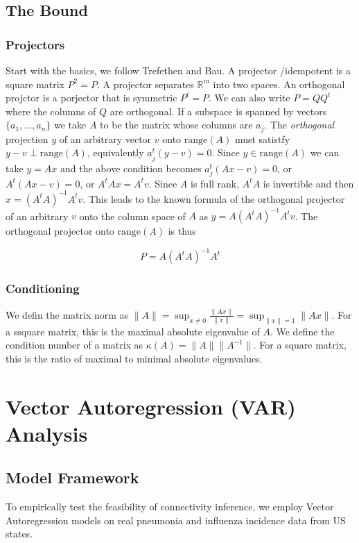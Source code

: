 
\subsection{The Bound}

\subsubsection{Projectors}
Start with the basics, we follow Trefethen and Bau. A projector
/idempotent is a square matrix $P^2 = P$. A projector separates
$\mathbb{R}^m$ into two spaces. An orthogonal projctor is a porjector
that is symmetric $P^t = P$. We can also write $P= QQ^t$ where the
columns of $Q$ are orthogonal. If a subspace is spanned by vectors
$\{a_1,\dots,a_n\}$ we take $A$ to be the matrix whose columns are
$a_j$. The \textit{orthogonal} projection $y$ of an arbitrary vector
$v$ onto $\text{range}(A)$ must satistfy $y-v \perp \text{range}(A)$,
equivalently $a_j^t(y-v) = 0$. Since $y \in \text{range}(A)$ we can
take $y =Ax$ and the above condition becomes $a_j^t(Ax-v) = 0$, or
$A^t(Ax-v) = 0$, or $A^tAx = A^tv$. Since $A$ is full rank, $A^tA$ is
invertible and then $x = (A^tA)^{-1}A^tv$. This leads to the known
formula of the orthogonal projector of an arbitrary $v$ onto the
column space of $A$ as $y = A(A^tA)^{-1}A^tv$. The orthogonal
projector onto $\text{range}(A)$ is thus

$$
P = A(A^tA)^{-1}A^t
$$


\subsubsection{Conditioning}
We defin the matrix norm as $\|A\| = \sup_{x\neq 0}
\frac{\|Ax\|}{\|x\|} = \sup_{\|x\|=1} \|Ax\|$. For a ssquare matrix,
this is the maximal absolute eigenvalue of $A$. We define the
condition number of a matrix as $\kappa(A) = \|A\| \|A^{-1}\|$. For a
square matrix, this is the ratio of maximal to minimal absolute
eigenvalues.



\section{Vector Autoregression (VAR) Analysis}

\subsection{Model Framework}

To empirically test the feasibility of connectivity inference, we employ Vector Autoregression models on real pneumonia and influenza incidence data from US states.

